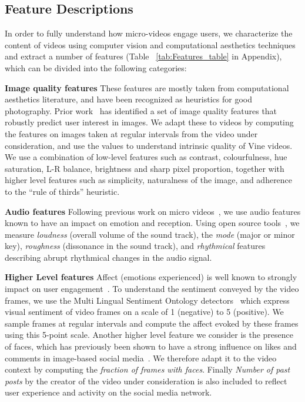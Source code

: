 \subsection{Feature Descriptions}
\label{sec:features}
In order to fully understand how micro-videos engage users, we characterize the content of videos using computer vision and computational aesthetics techniques and  extract a number of features (Table ~\ref{tab:Features_table} in Appendix), which can be divided into the following categories: 

	\noindent\textbf{Image quality features} These features are mostly taken from computational aesthetics literature, and have been recognized as heuristics for good photography. Prior work~\cite{predictingPintrest} has identified a set of image quality features that robustly predict user interest in images. We  adapt these to videos by computing  the features on images taken at regular intervals from the video under consideration, and use the values to understand intrinsic quality of Vine videos. We use a combination of low-level features such as contrast, colourfulness, hue saturation, L-R balance, brightness and sharp pixel proportion, together with higher level features such as simplicity, naturalness of the image, and adherence to the  ``rule of thirds'' heuristic. 
	
	\noindent\textbf{Audio features}	
	Following previous work on micro videos~\cite{redi20146}, we use audio features known to have an impact on emotion and reception. Using open source tools~\cite{lartillot2007matlab,laurier2009exploring}, we measure \emph{loudness} (overall volume of the sound track), the \emph{mode} (major or minor key), \emph{roughness} (dissonance in the sound track), and \emph{rhythmical} features describing abrupt rhythmical changes in the audio signal. 
	
	\noindent\textbf{Higher Level features} Affect (emotions experienced) is well known to strongly impact on user engagement~\cite{o2008user,leung2009user}. To understand the sentiment conveyed by the video frames, we use the Multi Lingual Sentiment Ontology detectors~\cite{jou2015visual} which express visual sentiment of video frames on a scale of 1 (negative) to 5 (positive). We sample frames at regular intervals and compute the affect evoked by these frames using this 5-point scale. Another higher level feature we consider is the presence of faces, which has previously been shown to have a strong influence on  likes and comments in image-based social media~\cite{bakhshi2014faces}. We therefore adapt it to the video context by computing the \emph{fraction of frames with faces}. Finally \emph{Number of past posts} by the creator of the video under consideration is also included to reflect user experience and activity on the social media network.
	
